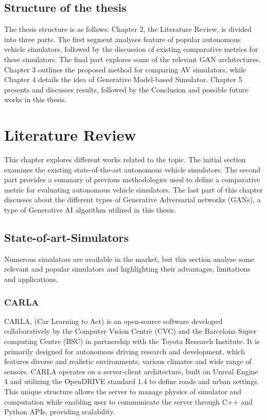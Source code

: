 \documentclass[12pt,twoside,a4paper,parskip]{scrbook} %
\begin{document}
\section{Structure of the thesis}
The thesis structure is as follows: Chapter 2, the Literature Review, is divided into three parts. The first segment analyses feature of popular autonomous vehicle simulators, followed by the discussion of existing comparative metrics for these simulators. The final part explores some of the relevant GAN architectures. Chapter 3 outlines the proposed method for comparing AV simulators, while Chapter 4 details the idea of Generative Model-based Simulator. Chapter 5 presents and discusses results, followed by the Conclusion and possible future works in this thesis.

\chapter{Literature Review}
This chapter explores different works related to the topic. The initial section examines the existing state-of-the-art autonomous vehicle simulators. The second part provides a summary of previous methodologies used to define a comparative metric for evaluating autonomous vehicle simulators. The last part of this chapter discusses about the different types of Generative Adversarial networks (GANs), a type of Generative AI algorithm utilized in this thesis. 
\section{State-of-art-Simulators}
Numerous simulators are available in the market, but this section analyse some relevant and popular simulators and highlighting their advantages, limitations and applications.
\subsection{CARLA}
CARLA, (Car Learning to Act) is an open-source software developed collaboratively by the Computer Vision Centre (CVC) and the Barcelona Super computing Centre (BSC) in partnership with the Toyota Research Institute. It is primarily designed for autonomous driving research and development, which features diverse and realistic environments, various climates and wide range of sensors. CARLA operates on a server-client architecture, built on Unreal Engine 4 and utilizing the OpenDRIVE standard 1.4 to define roads and urban settings. This unique structure allows the server to manage physics of simulator and computation while enabling user to communicate the server through C++ and Python APIs, providing scalability.
\end{document}
